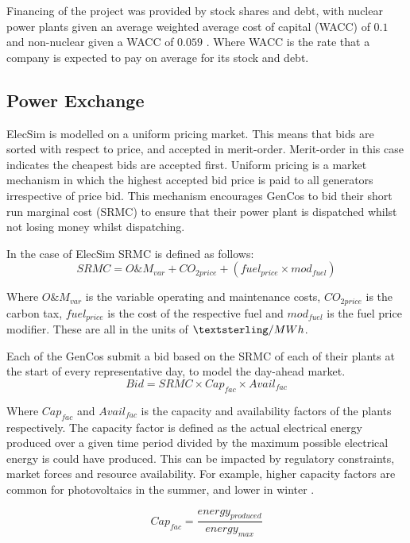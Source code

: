 \documentclass[final,3p,times,twocolumn,numbers]{elsarticle}
\begin{document}
Financing of the project was provided by stock shares and debt, with nuclear power plants given an average weighted average cost of capital (WACC) of $0.1$ and non-nuclear given a WACC of $0.059$ \cite{KPMG2017, Paper2012}. Where WACC is the rate that a company is expected to pay on average for its stock and debt.

\subsection{Power Exchange}

ElecSim is modelled on a uniform pricing market. This means that bids are sorted with respect to price, and accepted in merit-order. Merit-order in this case indicates the cheapest bids are accepted first. Uniform pricing is a market mechanism in which the highest accepted bid price is paid to all generators irrespective of price bid. This mechanism encourages GenCos to bid their short run marginal cost (SRMC) to ensure that their power plant is dispatched whilst not losing money whilst dispatching.

In the case of ElecSim SRMC is defined as follows:
\begin{equation}
\label{eq:srmc}
	SRMC = O\&M_{var}+CO_{2price}+\left(fuel_{price}\times mod_{fuel}\right)
\end{equation}

Where $O\&M_{var}$ is the variable operating and maintenance costs, $CO_{2price}$ is the carbon tax, $fuel_{price}$ is the cost of the respective fuel and $mod_{fuel}$ is the fuel price modifier. These are all in the units of  $\textsterling\slash MWh$. 

Each of the GenCos submit a bid based on the SRMC of each of their plants at the start of every representative day, to model the day-ahead market. 
\begin{equation}
	Bid = SRMC\times Cap_{fac} \times Avail_{fac}
\end{equation}

Where $Cap_{fac}$ and $Avail_{fac}$ is the capacity and availability factors of the plants respectively. The capacity factor is defined as the actual electrical energy produced over a given time period divided by the maximum possible electrical energy is could have produced. This can be impacted by regulatory constraints, market forces and resource availability. For example, higher capacity factors are common for photovoltaics in the summer, and lower in winter \cite{Kell}.

\begin{equation}
	Cap_{fac}=\frac{energy_{produced}}{energy_{max}}
\end{equation}
\end{document}
